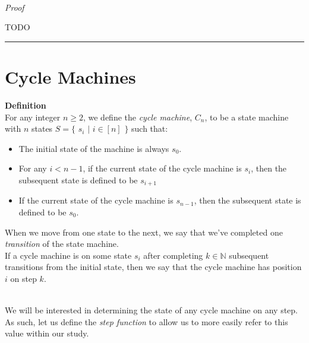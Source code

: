 \documentclass[a4paper,12pt]{article}
\begin{document}
\noindent \\
\textit{Proof}

TODO

\begin{center}
\noindent\rule{8cm}{0.4pt}
\end{center}

\section{Cycle Machines}
\label{section:cycle_machines}

\label{definition:cycle_machine}
\hypertarget{definition:cycle_machine}{}
\begin{tcolorbox}
\textbf{Definition}\\
For any integer $n \geq 2$, we define the \textit{cycle machine}, $C_n$, to be a state machine with $n$ states $S = \{$ $s_i$ $|$ $i \in [n]$ $\}$ such that:

\begin{itemize}
\item The initial state of the machine is always $s_0$.

\item For any $i < n - 1$, if the current state of the cycle machine is $s_i$, then the subsequent state is defined to be $s_{i+1}$

\item If the current state of the cycle machine is $s_{n - 1}$, then the subsequent state is defined to be $s_0$.
\end{itemize}

\noindent When we move from one state to the next, we say that we've completed one \textit{transition} of the state machine.\\

\noindent If a cycle machine is on some state $s_i$ after completing $k \in \mathbb{N}$ subsequent transitions from the initial state, then we say that the cycle machine has position $i$ on step $k$.\\
\end{tcolorbox}



\noindent \\
We will be interested in determining the state of any cycle machine on any step. As such, let us define the \textit{step function} to allow us to more easily refer to this value within our study.\\
\end{document}

